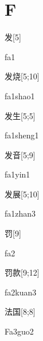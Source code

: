 ﻿%
\section*{F}

\begin{verbete}[fa1]{发}[5]
\begin{pronuncia}{fa1}
\end{pronuncia}
\end{verbete}

\begin{verbete}[fa1shao1]{发烧}[5;10]
\begin{pronuncia}{fa1shao1}
\end{pronuncia}
\end{verbete}

\begin{verbete}[fa1sheng1]{发生}[5;5]
\begin{pronuncia}{fa1sheng1}
\end{pronuncia}
\end{verbete}

\begin{verbete}[fa1yin1]{发音}[5;9]
\begin{pronuncia}{fa1yin1}
\end{pronuncia}
\end{verbete}

\begin{verbete}[fa1zhan3]{发展}[5;10]
\begin{pronuncia}{fa1zhan3}
\end{pronuncia}
\end{verbete}

\begin{verbete}[fa2]{罚}[9]
\begin{pronuncia}{fa2}
\end{pronuncia}
\end{verbete}

\begin{verbete}[fa2kuan3]{罚款}[9;12]
\begin{pronuncia}{fa2kuan3}
\end{pronuncia}
\end{verbete}

\begin{verbete}[Fa3guo2]{法国}[8;8]
\begin{pronuncia}{Fa3guo2}
\end{pronuncia}
\end{verbete}

